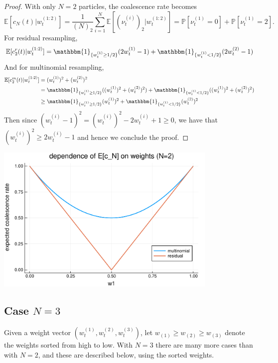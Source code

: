 \documentclass{article}
\newcommand{\Prob}{\mathbb{P}}
\newcommand{\E}{\mathbb{E}}
\newcommand{\I}[1]{\mathbbm{1}_{\{#1\}}}
\newcommand{\1}[1]{\mathbbm{1}_{#1}}
\begin{document}
\begin{proof}
With only $N=2$ particles, the coalescence rate becomes
\begin{equation*}
\E[c_N(t) |w_t^{(1:2)}] = \frac{1}{(N)_2} \sum_{i=1}^{N} \E\left[ (\nu_t^{(i)})_2 |w_t^{(1:2)} \right] 
= \Prob[\nu_t^{(1)} = 0] + \Prob[\nu_t^{(1)} = 2].
\end{equation*}
For residual resampling,
\begin{equation*}
\E[c_2^r(t) |w_t^{(1:2)}] = \I{w_t^{(1)} \geq 1/2} (2w_t^{(1)} -1) + \I{w_t^{(1)} < 1/2} (2w_t^{(2)} -1)
\end{equation*}
And for multinomial resampling,
\begin{align*}
\E[c_2^m(t) |w_t^{(1:2)}] &= (w_t^{(1)})^2 + (w_t^{(2)})^2 \\
&= \I{w_t^{(1)} \geq 1/2} ((w_t^{(1)})^2 + (w_t^{(2)})^2) + \I{w_t^{(1)} < 1/2} ((w_t^{(1)})^2 + (w_t^{(2)})^2) \\
&\geq  \I{w_t^{(1)} \geq 1/2} (w_t^{(1)})^2 + \I{w_t^{(1)} < 1/2} (w_t^{(2)})^2
\end{align*}
Then since $(w_t^{(i)} -1)^2 = (w_t^{(i)})^2 -2w_t^{(i)} +1 \geq 0$, we have that $(w_t^{(i)})^2 \geq 2w_t^{(i)} -1$ and hence we conclude the proof.
\end{proof}

\begin{center}
\includegraphics[width=0.8\textwidth]{plots/EcN_mn_res_N2.pdf}
\end{center}


\subsection{Case $N=3$}
Given a weight vector $(w_t^{(1)}, w_t^{(2)}, w_t^{(3)})$, let $w_{(1)} \geq w_{(2)} \geq w_{(3)}$ denote the weights sorted from high to low. 
With $N=3$ there are many more cases than with $N=2$, and these are described below, using the sorted weights.
\end{document}
